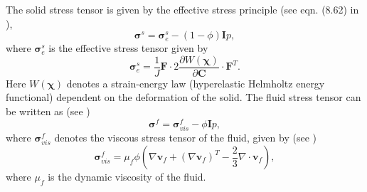 The solid stress tensor is given by the effective stress principle (see eqn. (8.62) in \cite{boer2005trends}),
\begin{equation}
\boldsymbol\sigma^{s} =\boldsymbol\sigma^{s}_{e} - (1-\phi)\boldsymbol{I}p,
\end{equation}
where $\boldsymbol\sigma^{s}_{e}$ is the effective stress tensor given by
\begin{equation}
\boldsymbol\sigma^{s}_{e}=\frac{1}{J}\boldsymbol{F}\cdot 2 \frac{\partial W(\boldsymbol\chi)}{\partial \boldsymbol{C}}  \cdot \boldsymbol{F}^{T}.
\label{eqn:sigma_e}
\end{equation}
Here $W(\boldsymbol{\chi})$ denotes a strain-energy law (hyperelastic Helmholtz energy functional) dependent on the deformation of the solid. The fluid stress tensor can be written as (see \cite[eqn. (8.63)]{boer2005trends})
\begin{equation}
\boldsymbol\sigma^{f} =\boldsymbol\sigma^{f}_{vis} - \phi\boldsymbol{I}p,
\label{eqn:sigma_vis}
\end{equation}
where $\boldsymbol\sigma^{f}_{vis}$ denotes the viscous stress tensor of the fluid, given by  (see \cite[eqn. (6.145)]{boer2005trends})
\begin{equation}
\boldsymbol\sigma^{f}_{vis}= \mu_{f} \phi ( \nabla \boldsymbol{v}_f + (\nabla \boldsymbol{v}_f)^{T} - \frac{2}{3}\nabla \cdot\boldsymbol{v}_f),
\label{eqn:viscous_stress}
\end{equation}
where $\mu_{f}$ is the dynamic viscosity of the fluid. \newline

